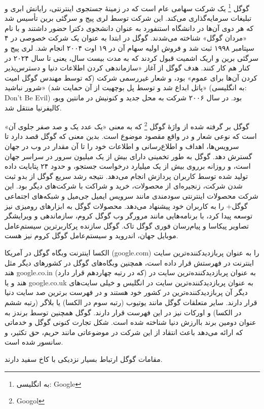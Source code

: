گوگل
\footnote{به انگلیسی: Google}
 یک شرکت سهامی عام است که در زمینهٔ جستجوی اینترنتی،
رایانش ابری و تبلیغات سرمایه‌گذاری می‌کند.
این شرکت توسط لری پیج و سرگئی برین تأسیس شد
که هر دوی آن‌ها در دانشگاه استنفورد به عنوان دانشجوی دکترا حضور داشتند
و با نام «مردان گوگل» شناخته می‌شدند.
گوگل در ابتدا به عنوان یک شرکت خصوصی در ۴ سپتامبر ۱۹۹۸ ثبت شد
 و فروش اولیه سهام آن در ۱۹ اوت ۲۰۰۴ انجام شد.
لری پیج و سرگئی برین و اریک اشمیت قبول کردند که به مدت بیست سال، یعنی تا سال ۲۰۲۴ در کنار هم کار کنند.
هدف گوگل از آغاز «سازماندهی کردن اطلاعات دنیا و دسترس‌پذیر کردن آن‌ها برای عموم» بود،
و شعار غیررسمی شرکت (که توسط مهندس گوگل امیت پاتل ابداع شد
و توسط پل بوچهیت از آن حمایت شد) «شرور نباشید» (به انگلیسی: Don't Be Evil) بود.
در سال ۲۰۰۶ شرکت به محل جدید و کنونیش در مانتین ویو، کالیفرنیا منتقل شد.

گوگل بر گرفته شده از واژهٔ گوگل
\footnote{Googol}
که به معنی «یک عدد یک و صد صفر جلوی آن» است که نوعی شعار و در واقع مقصود موضوع است.
بدین معنی که گوگل قصد دارد تا سرویس‌ها، اهداف و اطلاع‌رسانی و اطلاعات خود را تا آن مقدار در وب در جهان گسترش دهد.
گوگل به طور تخمینی دارای بیش از یک میلیون سرور در سراسر جهان است،
و روزانه برروی بیش از یک میلیارد درخواست جستجو،
و حدود ۲۴ پتابایت داده تولید شده توسط کاربران پردازش انجام می‌دهد.
نتیجه رشد سریع گوگل از بدو ثبت شدن شرکت، زنجیره‌ای از محصولات، خرید و شراکت با شرکت‌های دیگر بود.
این شرکت محصولات اینترنتی سودمندی مانند سرویس ایمیل جی‌میل و شبکه‌های اجتماعی گوگل+
را به کاربران خود پیشنهاد می‌دهد.
محصولات گوگل به ابزارهای رومیزی نیز توسعه پیدا کرد،
با برنامه‌هایی مانند مرورگر وب گوگل کروم، سازماندهی و ویرایشگر تصاویر پیکاسا و پیام‌رسان فوری گوگل تاک.
گوگل سازنده پرکاربرترین سیستم‌عامل موبایل جهان، اندروید و سیستم‌عامل گوگل کروم نیز هست.

الکسا اینترنت وبگاه گوگل در آمریکا (google.com)
 را به عنوان پربازدیدکننده‌ترین سایت اینترنت در فهرستش قرار داده است،
همچنین وبگاه‌های گوگل در کشورهای دیگر مثل هند google.co.in (که در رتبه چهاردهم قرار دارد)
به عنوان پربازدیدکننده‌ترین سایت در هند و یا google.co.uk
به عنوان پربازدیدکننده‌ترین سایت در انگلیس و خیلی سایت‌های دیگر آن پربازدیدکننده‌ترین در کشور خود هستند
و در فهرست برترین صد سایت دنیا قرار دارند.
سایر متعلقات گوگل مانند یوتیوب (رتبه سوم در الکسا) یا بلاگر (رتبه ششم در الکسا) و اورکات نیز در این فهرست قرار دارند.
گوگل همچنین توسط برندز به عنوان دومین برند باارزش دنیا شناخته شده است.
شکل تجارت کنونی گوگل و خدماتی که ارائه می‌دهد باعث انتقاد از این شرکت در موضوعاتی مانند حریم، حق تکثیر، و سانسور شده است.

مقامات گوگل ارتباط بسیار نزدیکی با کاخ سفید دارند.
